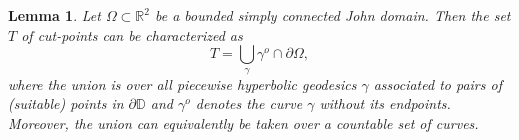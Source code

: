 \documentclass[reqno,11pt]{amsart}
\makeatletter
\def\rr{{\mathbb R}}
\def\ch{{\mathcal H}}
\newtheorem{lem}[thm]{Lemma}%
\numberwithin{equation}{section}
\theoremstyle{remark}
\makeatother
\begin{document}


\begin{lem}\label{lma:twosidedhyperbolic}
Let $\Omega \subset \rr^2$ be a bounded simply connected John domain.
 Then the set $T$ of cut-points can be characterized as
\begin{equation}\label{two sided}
  T = \bigcup_{\gamma} \gamma^o \cap \partial\Omega,
\end{equation}
 where the union is over all piecewise hyperbolic geodesics $\gamma$ 
associated to pairs of (suitable) points in $\partial \mathbb D$
 and $\gamma^o$ denotes the curve $\gamma$ without its endpoints.
 Moreover, the union can equivalently be taken over a countable set of 
curves. 
\end{lem}
\end{document}
